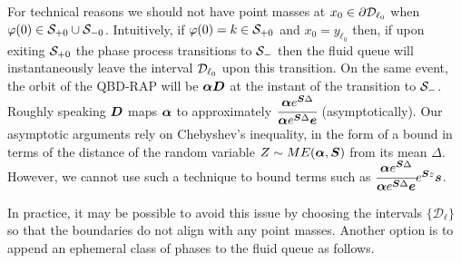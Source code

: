 \begin{rem}
For technical reasons we should not have point masses at \(x_0\in\partial \mathcal{D}_{\ell_0}\) when \(\varphi(0)\in\mathcal{S}_{+0}\cup\mathcal{S}_{-0}\). Intuitively, if \(\varphi(0)=k\in\mathcal{S}_{+0}\) and \(x_0 = y_{\ell_0}\) then, if upon exiting \(\mathcal{S}_{+0}\) the phase process transitions to \(\mathcal{S}_-\) then the fluid queue will instantaneously leave the interval \(\mathcal{D}_{\ell_0}\) upon this transition. On the same event, the orbit of the QBD-RAP will be \(\boldsymbol \alpha \boldsymbol D\) at the instant of the transition to \(\mathcal{S}_-\). Roughly speaking \(\boldsymbol D\) maps \(\boldsymbol \alpha\) to approximately \(\cfrac{\boldsymbol \alpha e^{\boldsymbol S\Delta}}{\boldsymbol \alpha e^{\boldsymbol S\Delta}\boldsymbol e}\) (asymptotically). Our asymptotic arguments rely on Chebyshev's inequality, in the form of a bound in terms of the distance of the random variable \(Z\sim ME(\boldsymbol\alpha,\boldsymbol S)\) from its mean \(\Delta\). However, we cannot use such a technique to bound terms such as \(\cfrac{\boldsymbol \alpha e^{\boldsymbol S\Delta}}{\boldsymbol \alpha e^{\boldsymbol S\Delta}\boldsymbol e}e^{\boldsymbol Sz}\boldsymbol s\). %

In practice, it may be possible to avoid this issue by choosing the intervals \(\{\mathcal D_\ell\}\) so that the boundaries do not align with any point masses. Another option is to append an ephemeral class of phases to the fluid queue as follows. 


\end{rem}
